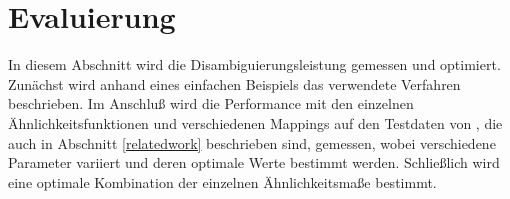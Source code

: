 \section{Evaluierung}\label{sec:evaluierung}
In diesem Abschnitt wird die Disambiguierungsleistung gemessen und optimiert.
Zunächst wird anhand eines einfachen Beispiels das verwendete Verfahren beschrieben. %
Im Anschluß wird die Performance mit den einzelnen Ähnlichkeitsfunktionen und verschiedenen Mappings auf den Testdaten von \citet{cucerzan2007}, die auch in Abschnitt \ref{relatedwork} beschrieben sind, gemessen, wobei verschiedene Parameter variiert und deren optimale Werte bestimmt werden.
Schließlich wird eine optimale Kombination der einzelnen Ähnlichkeitsmaße bestimmt.

